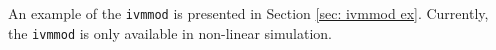An example of the \verb|ivmmod| is presented in Section \ref{sec: ivmmod ex}.
Currently, the \verb|ivmmod| is only available in non-linear simulation.



